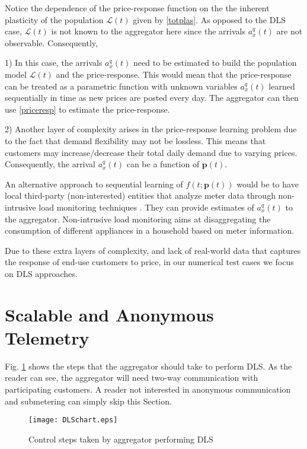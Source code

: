\documentclass[10pt]{IEEEtran}
\begin{document}
Notice the dependence of the price-response function on the  the inherent plasticity of the population  $\mathcal{L}(t)$ given by \eqref{totplas}. As opposed to the DLS case,  $\mathcal{L}(t)$  is not known to the aggregator here  since the arrivals $a^q_x(t)$ are not observable.
Consequently,

 1) In this case, the arrivals $a^q_x(t)$ need to be estimated to build the population model $\mathcal{L}(t)$ and the price-response. This would mean that the price-response can be treated as a parametric function with unknown variables $a^q_x(t)$ learned sequentially in time as new prices are posted every day. The aggregator can then use \eqref{priceresp} to estimate the price-response. 

 2) Another layer of complexity arises in the price-response learning problem due to the fact that demand flexibility may not be lossless. This means that customers may increase/decrease their total daily demand due to varying prices. Consequently, the arrival $a^q_x(t)$ can be a function of $\mathbf{p}(t)$. 

An alternative approach to sequential learning of $ f(t;\mathbf{p}(t))$ would be to have local third-party (non-interested) entities that analyze meter data through non-intrusive load monitoring techniques  \cite{nlm}. They can provide estimates of $a^q_x(t)$ to the aggregator. Non-intrusive load monitoring aims at disaggregating the consumption of different appliances in a household based on meter information.


Due to these extra layers of complexity, and lack of real-world data that captures the response of end-use customers to price,  in our numerical test cases we focus on DLS approaches.  


\section{Scalable and Anonymous Telemetry}\label{sec.anoncom}
Fig. \ref{DLSchart} shows the steps that the aggregator should take to perform DLS. As the reader can see, the aggregator will need two-way communication with participating customers. A reader not interested in anonymous communication and submetering can simply skip this Section.

\begin{figure}[t]
\centering
\texttt{[image: DLSchart.eps]} 
\caption{Control steps taken by aggregator performing DLS}
\label{DLSchart}
\end{figure}
\end{document}
